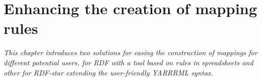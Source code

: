 
\chapter{Enhancing the creation of mapping rules}
\label{chapter:creation}

\textit{This chapter introduces two solutions for easing the construction of mappings for different potential users, for RDF with a tool based on rules in spreadsheets and other for RDF-star extending the user-friendly YARRRML syntax.}



